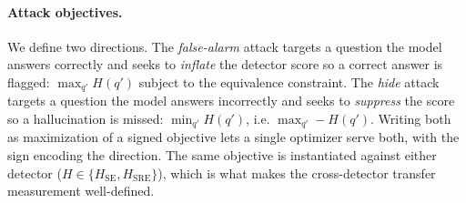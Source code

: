 \paragraph{Attack objectives.}
We define two directions. The \emph{false-alarm} attack targets a question the
model answers correctly and seeks to \emph{inflate} the detector score so a
correct answer is flagged:
$\max_{q'} H(q')$ subject to the equivalence constraint.
The \emph{hide} attack targets a question the model answers incorrectly and seeks
to \emph{suppress} the score so a hallucination is missed:
$\min_{q'} H(q')$, i.e. $\max_{q'} -H(q')$. Writing both as maximization of a
signed objective lets a single optimizer serve both, with the sign encoding the
direction. The same objective is instantiated against either detector
($H \in \{H_{\mathrm{SE}}, H_{\mathrm{SRE}}\}$), which is what makes the
cross-detector transfer measurement well-defined.

